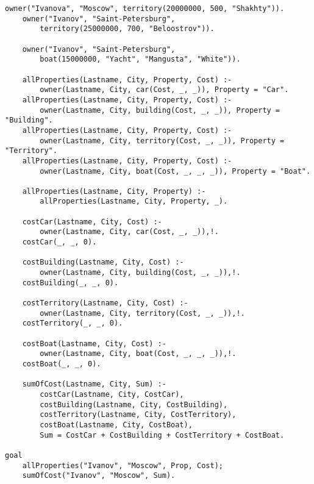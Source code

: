 \begin{lstlisting}[caption=Текст программы]
	owner("Ivanova", "Moscow", territory(20000000, 500, "Shakhty")).
	owner("Ivanov", "Saint-Petersburg",
		territory(25000000, 700, "Beloostrov")).

	owner("Ivanov", "Saint-Petersburg",
		boat(15000000, "Yacht", "Mangusta", "White")).

	allProperties(Lastname, City, Property, Cost) :-
		owner(Lastname, City, car(Cost, _, _)), Property = "Car".
	allProperties(Lastname, City, Property, Cost) :-
		owner(Lastname, City, building(Cost, _, _)), Property = "Building".
	allProperties(Lastname, City, Property, Cost) :-
		owner(Lastname, City, territory(Cost, _, _)), Property = "Territory".
	allProperties(Lastname, City, Property, Cost) :-
		owner(Lastname, City, boat(Cost, _, _, _)), Property = "Boat".

	allProperties(Lastname, City, Property) :-
		allProperties(Lastname, City, Property, _).

	costCar(Lastname, City, Cost) :-
		owner(Lastname, City, car(Cost, _, _)),!.
	costCar(_, _, 0).

	costBuilding(Lastname, City, Cost) :-
		owner(Lastname, City, building(Cost, _, _)),!.
	costBuilding(_, _, 0).

	costTerritory(Lastname, City, Cost) :-
		owner(Lastname, City, territory(Cost, _, _)),!.
	costTerritory(_, _, 0).

	costBoat(Lastname, City, Cost) :-
		owner(Lastname, City, boat(Cost, _, _, _)),!.
	costBoat(_, _, 0).

	sumOfCost(Lastname, City, Sum) :-
		costCar(Lastname, City, CostCar),
		costBuilding(Lastname, City, CostBuilding),
		costTerritory(Lastname, City, CostTerritory),
		costBoat(Lastname, City, CostBoat),
		Sum = CostCar + CostBuilding + CostTerritory + CostBoat.

goal
	allProperties("Ivanov", "Moscow", Prop, Cost);
	sumOfCost("Ivanov", "Moscow", Sum).
\end{lstlisting}
